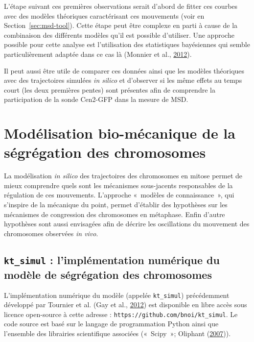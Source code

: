 \documentclass[12pt,a4paper,twoside,openright]{book}
\begin{document}
L'étape suivant ces premières observations serait d'abord de fitter ces
courbes avec des modèles théoriques caractérisant ces mouvements (voir
en Section~\ref{sec:msd-tool}). Cette étape peut être complexe en parti
à cause de la combinaison des différents modèles qu'il est possible
d'utiliser. Une approche possible pour cette analyse est l'utilisation
des statistiques bayésiennes qui semble particulièrement adaptée dans ce
cas là (Monnier et al., \protect\hyperlink{ref-Monnier2012}{2012}).

Il peut aussi être utile de comparer ces données ainsi que les modèles
théoriques avec des trajectoires simulées \emph{in silico} et d'observer
si les même effets au temps court (les deux premières pentes) sont
présentes afin de comprendre la participation de la sonde Cen2-GFP dans
la mesure de MSD.

\section{Modélisation bio-mécanique de la ségrégation des
chromosomes}\label{moduxe9lisation-bio-muxe9canique-de-la-suxe9gruxe9gation-des-chromosomes}

La modélisation \emph{in silico} des trajectoires des chromosomes en
mitose permet de mieux comprendre quels sont les mécanismes sous-jacents
responsables de la régulation de ces mouvements. L'approche «~modèles de
connaissance~», qui s'inspire de la mécanique du point, permet d'établir
des hypothèses sur les mécanismes de congression des chromosomes en
métaphase. Enfin d'autre hypothèses sont aussi envisagées afin de
décrire les oscillations du mouvement des chromosomes observées \emph{in
vivo}.

\subsection{\texorpdfstring{\texttt{kt\_simul} : l'implémentation
numérique du modèle de ségrégation des
chromosomes}{kt\_simul : l'implémentation numérique du modèle de ségrégation des chromosomes}}\label{ktux5fsimul-limpluxe9mentation-numuxe9rique-du-moduxe8le-de-suxe9gruxe9gation-des-chromosomes}

L'implémentation numérique du modèle (appelée \texttt{kt\_simul})
précédemment développé par Tournier et al. (Gay et al.,
\protect\hyperlink{ref-Gay2012a}{2012}) est disponible en libre accès
sous licence open-source à cette adresse :
\texttt{https://github.com/bnoi/kt\_simul}. Le code source est basé sur
le langage de programmation Python ainsi que l'ensemble des librairies
scientifique associées («~Scipy~»; Oliphant
(\protect\hyperlink{ref-Oliphant2007}{2007})).
\end{document}
